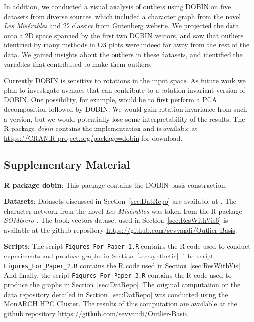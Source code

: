 \documentclass[letter,12pt]{article}
\begin{document}
In addition, we conducted a visual analysis of outliers using DOBIN on five datasets from diverse sources, which included a character graph from the novel \textit{Les Mis\'erables} and $22$ classics from Gutenberg website. We projected the data onto a 2D space spanned by the first two DOBIN vectors, and saw that outliers identified by many methods in O3 plots were indeed far away from the rest of the data. We gained insights about the outliers in these datasets, and identified the variables that contributed to make them outliers.


Currently DOBIN is sensitive to rotations in the input space. As future work we plan to investigate avenues that can contribute to a rotation invariant version of DOBIN. One possibility, for example, would be to first perform a PCA decomposition followed by DOBIN. We would gain rotation-invariance from such a version, but we would potentially lose some interpretability of the results. The R package \textit{dobin} contains the implementation and is available at \url{https://CRAN.R-project.org/package=dobin} for download.

\clearpage

\subsection*{Supplementary Material}

\textbf{R package dobin}: This package contains the DOBIN basis construction.

\textbf{Datasets}: Datasets discussed in Section~\ref{sec:DatRepo} are available at \cite{datasets}. The character network from the novel \textit{Les Mis\'erables} was taken from the R package \textit{SOMbrero} \citep{sombrero}. The book vectors dataset used in Section~\ref{sec:ResWithVis6} is available at the github repository \url{https://github.com/sevvandi/Outlier-Basis}.

\textbf{Scripts}: The script \texttt{Figures\_For\_Paper\_1.R} contains the R code used to conduct experiments and produce graphs in Section~\ref{sec:synthetic}. The script \texttt{Figures\_For\_Paper\_2.R} contains the R code used in Section~\ref{sec:ResWithVis}. And finally, the script \texttt{Figures\_For\_Paper\_3.R} contains the R code used to produce the graphs in Section~\ref{sec:DatRepo}. The original computation on the data repository detailed in Section~\ref{sec:DatRepo} was conducted using the MonARCH HPC Cluster. The results of this computation are available at the github repository \url{https://github.com/sevvandi/Outlier-Basis}.
\end{document}
